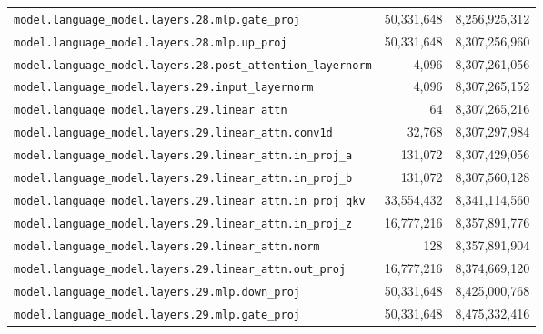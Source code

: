 \documentclass[10pt,a4paper]{article}
\theoremstyle{definition}
\begin{document}
\begin{appendices}
\begin{longtable}{p{9.5cm}rr}
\texttt{model.\allowbreak{}language\_model.\allowbreak{}layers.\allowbreak{}28.\allowbreak{}mlp.\allowbreak{}gate\_proj} & 50,331,648 & 8,256,925,312 \\
\texttt{model.\allowbreak{}language\_model.\allowbreak{}layers.\allowbreak{}28.\allowbreak{}mlp.\allowbreak{}up\_proj} & 50,331,648 & 8,307,256,960 \\
\texttt{model.\allowbreak{}language\_model.\allowbreak{}layers.\allowbreak{}28.\allowbreak{}post\_attention\_layernorm} & 4,096 & 8,307,261,056 \\
\texttt{model.\allowbreak{}language\_model.\allowbreak{}layers.\allowbreak{}29.\allowbreak{}input\_layernorm} & 4,096 & 8,307,265,152 \\
\texttt{model.\allowbreak{}language\_model.\allowbreak{}layers.\allowbreak{}29.\allowbreak{}linear\_attn} & 64 & 8,307,265,216 \\
\texttt{model.\allowbreak{}language\_model.\allowbreak{}layers.\allowbreak{}29.\allowbreak{}linear\_attn.\allowbreak{}conv1d} & 32,768 & 8,307,297,984 \\
\texttt{model.\allowbreak{}language\_model.\allowbreak{}layers.\allowbreak{}29.\allowbreak{}linear\_attn.\allowbreak{}in\_proj\_a} & 131,072 & 8,307,429,056 \\
\texttt{model.\allowbreak{}language\_model.\allowbreak{}layers.\allowbreak{}29.\allowbreak{}linear\_attn.\allowbreak{}in\_proj\_b} & 131,072 & 8,307,560,128 \\
\texttt{model.\allowbreak{}language\_model.\allowbreak{}layers.\allowbreak{}29.\allowbreak{}linear\_attn.\allowbreak{}in\_proj\_qkv} & 33,554,432 & 8,341,114,560 \\
\texttt{model.\allowbreak{}language\_model.\allowbreak{}layers.\allowbreak{}29.\allowbreak{}linear\_attn.\allowbreak{}in\_proj\_z} & 16,777,216 & 8,357,891,776 \\
\texttt{model.\allowbreak{}language\_model.\allowbreak{}layers.\allowbreak{}29.\allowbreak{}linear\_attn.\allowbreak{}norm} & 128 & 8,357,891,904 \\
\texttt{model.\allowbreak{}language\_model.\allowbreak{}layers.\allowbreak{}29.\allowbreak{}linear\_attn.\allowbreak{}out\_proj} & 16,777,216 & 8,374,669,120 \\
\texttt{model.\allowbreak{}language\_model.\allowbreak{}layers.\allowbreak{}29.\allowbreak{}mlp.\allowbreak{}down\_proj} & 50,331,648 & 8,425,000,768 \\
\texttt{model.\allowbreak{}language\_model.\allowbreak{}layers.\allowbreak{}29.\allowbreak{}mlp.\allowbreak{}gate\_proj} & 50,331,648 & 8,475,332,416 \\

\end{longtable}
\end{appendices}
\end{document}
